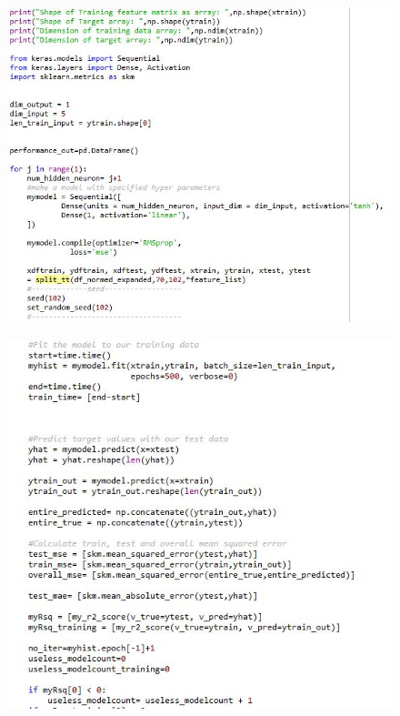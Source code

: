 \documentclass[]{article}
\begin{document}
\begin{figure}
\centering
\includegraphics[width=1\textwidth,height=\textheight]{images/flann3.jpg}
\end{figure}

\begin{figure}
\centering
\includegraphics[width=1\textwidth,height=\textheight]{images/flann4.jpg}
\end{figure}
\end{document}
